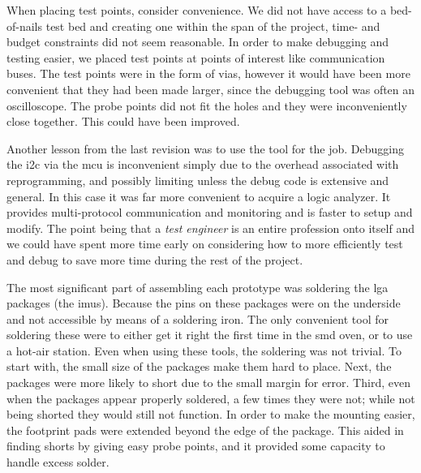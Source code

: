 When placing test points, consider convenience. We did not have access to a bed-of-nails test bed and creating one within the span of the project, time- and budget constraints did not seem reasonable. In order to make debugging and testing easier, we placed test points at points of interest like communication buses. The test points were in the form of vias, however it would have been more convenient that they had been made larger, since the debugging tool was often an oscilloscope. The probe points did not fit the holes and they were inconveniently close together. This could have been improved.

Another lesson from the last revision was to use the tool for the job. Debugging the \gls{i2c} via the \gls{mcu} is inconvenient simply due to the overhead associated with reprogramming, and possibly limiting unless the debug code is extensive and general. In this case it was far more convenient to acquire a logic analyzer. It provides multi-protocol communication and monitoring and is faster to setup and modify. The point being that a \emph{test engineer} is an entire profession onto itself and we could have spent more time early on considering how to more efficiently test and debug to save more time during the rest of the project. 

The most significant part of assembling each prototype was soldering the \gls{lga} packages (the \gls{imu}s). Because the pins on these packages were on the underside and not accessible by means of a soldering iron. The only convenient tool for soldering these were to either get it right the first time in the \gls{smd} oven, or to use a hot-air station. Even when using these tools, the soldering was not trivial. To start with, the small size of the packages make them hard to place. Next, the packages were more likely to short due to the small margin for error. Third, even when the packages appear properly soldered, a few times they were not; while not being shorted they would still not function.  In order to make the mounting easier, the footprint pads were extended beyond the edge of the package. This aided in finding shorts by giving easy probe points, and it provided some capacity to handle excess solder. 

